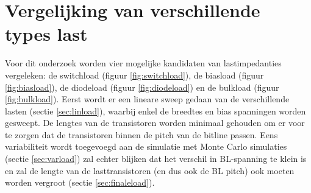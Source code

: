 \section{Vergelijking van verschillende types last}
Voor dit onderzoek worden vier mogelijke kandidaten van lastimpedanties vergeleken: de switchload (figuur \ref{fig:switchload}), de biasload (figuur \ref{fig:biasload}), de diodeload (figuur \ref{fig:diodeload}) en de bulkload (figuur \ref{fig:bulkload})\cite{bulkload}. Eerst wordt er een lineare sweep gedaan van de verschillende lasten (sectie \ref{sec:linload}), waarbij enkel de breedtes en bias spanningen worden gesweept. De lengtes van de transistoren worden minimaal gehouden om er voor te zorgen dat de transistoren binnen de pitch van de bitline passen. Eens variabiliteit wordt toegevoegd aan de simulatie met Monte Carlo simulaties (sectie \ref{sec:varload}) zal echter blijken dat het verschil in BL-spanning te klein is en zal de lengte van de lasttransistoren (en dus ook de BL pitch) ook moeten worden vergroot (sectie \ref{sec:finaleload}).

